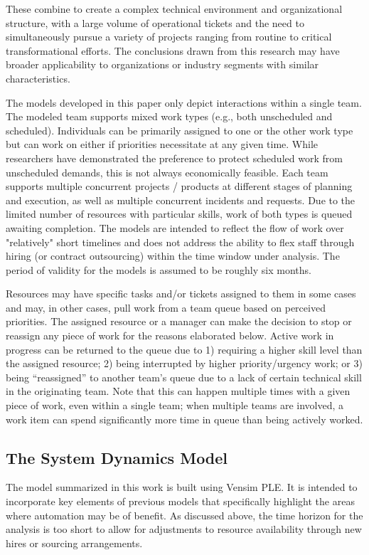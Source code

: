 \documentclass[conference]{IEEEtran}
\begin{document}
These combine to create a complex technical environment and organizational structure, with a large volume of operational tickets and the need to simultaneously pursue a variety of projects ranging from routine to critical transformational efforts. The conclusions drawn from this research may have broader applicability to organizations or industry segments with similar characteristics.

The models developed in this paper only depict interactions within a single team. The modeled team supports mixed work types (e.g., both unscheduled and scheduled). Individuals can be primarily assigned to one or the other work type but can work on either if priorities necessitate at any given time. While researchers have demonstrated the preference to protect scheduled work from unscheduled demands, this is not always economically feasible. Each team supports multiple concurrent projects / products at different stages of planning and execution, as well as multiple concurrent incidents and requests. Due to the limited number of resources with particular skills, work of both types is queued awaiting completion. The models are intended to reflect the flow of work over "relatively" short timelines and does not address the ability to flex staff through hiring (or contract outsourcing) within the time window under analysis. The period of validity for the models is assumed to be roughly six months.

Resources may have specific tasks and/or tickets assigned to them in some cases and may, in other cases, pull work from a team queue based on perceived priorities. The assigned resource or a manager can make the decision to stop or reassign any piece of work for the reasons elaborated below. Active work in progress can be returned to the queue due to 1) requiring a higher skill level than the assigned resource; 2) being interrupted by higher priority/urgency work; or 3) being ``reassigned'' to another team's queue due to a lack of certain technical skill in the originating team. Note that this can happen multiple times with a given piece of work, even within a single team; when multiple teams are involved, a work item can spend significantly more time in queue than being actively worked. 

\subsection{The System Dynamics Model}

The model summarized in this work is built using Vensim PLE. It is intended to incorporate key elements of previous models that specifically highlight the areas where automation may be of benefit. As discussed above, the time horizon for the analysis is too short to allow for adjustments to resource availability through new hires or sourcing arrangements. 
\end{document}
